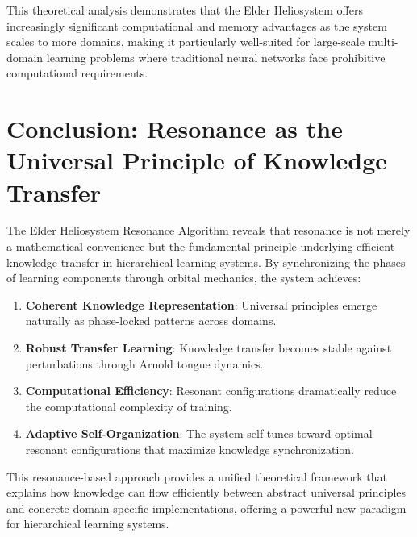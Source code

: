This theoretical analysis demonstrates that the Elder Heliosystem offers increasingly significant computational and memory advantages as the system scales to more domains, making it particularly well-suited for large-scale multi-domain learning problems where traditional neural networks face prohibitive computational requirements.

\section{Conclusion: Resonance as the Universal Principle of Knowledge Transfer}

The Elder Heliosystem Resonance Algorithm reveals that resonance is not merely a mathematical convenience but the fundamental principle underlying efficient knowledge transfer in hierarchical learning systems. By synchronizing the phases of learning components through orbital mechanics, the system achieves:

\begin{enumerate}
    \item \textbf{Coherent Knowledge Representation}: Universal principles emerge naturally as phase-locked patterns across domains.
    
    \item \textbf{Robust Transfer Learning}: Knowledge transfer becomes stable against perturbations through Arnold tongue dynamics.
    
    \item \textbf{Computational Efficiency}: Resonant configurations dramatically reduce the computational complexity of training.
    
    \item \textbf{Adaptive Self-Organization}: The system self-tunes toward optimal resonant configurations that maximize knowledge synchronization.
\end{enumerate}

This resonance-based approach provides a unified theoretical framework that explains how knowledge can flow efficiently between abstract universal principles and concrete domain-specific implementations, offering a powerful new paradigm for hierarchical learning systems.